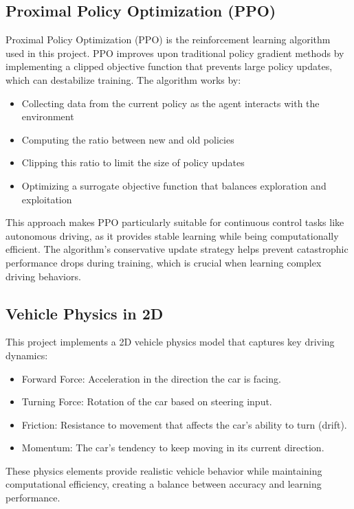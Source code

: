 \documentclass[10pt,twocolumn]{article}
\begin{document}
\subsection{Proximal Policy Optimization (PPO)}
Proximal Policy Optimization (PPO) is the reinforcement learning algorithm used in this project. PPO improves upon traditional policy gradient methods by implementing a clipped objective function that prevents large policy updates, which can destabilize training\cite{schulman2017proximal}. The algorithm works by:

\begin{itemize}
    \item Collecting data from the current policy as the agent interacts with the environment
    \item Computing the ratio between new and old policies
    \item Clipping this ratio to limit the size of policy updates
    \item Optimizing a surrogate objective function that balances exploration and exploitation
\end{itemize}

This approach makes PPO particularly suitable for continuous control tasks like autonomous driving, as it provides stable learning while being computationally efficient. The algorithm's conservative update strategy helps prevent catastrophic performance drops during training, which is crucial when learning complex driving behaviors.

\subsection{Vehicle Physics in 2D}
This project implements a 2D vehicle physics model that captures key driving dynamics:
\begin{itemize}
    \item Forward Force: Acceleration in the direction the car is facing.
    \item Turning Force: Rotation of the car based on steering input.
    \item Friction: Resistance to movement that affects the car's ability to turn (drift).
    \item Momentum: The car's tendency to keep moving in its current direction.
\end{itemize}


These physics elements provide realistic vehicle behavior while maintaining computational efficiency, creating a balance between accuracy and learning performance.
\end{document}
